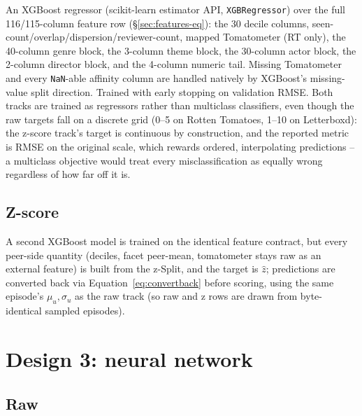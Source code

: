 \documentclass[11pt]{article}
\begin{document}
An XGBoost regressor (scikit-learn estimator API, \texttt{XGBRegressor}) over the full 116/115-column feature row (\S\ref{sec:features-eq}): the 30 decile columns, seen-count/overlap/dispersion/reviewer-count, mapped Tomatometer (RT only), the 40-column genre block, the 3-column theme block, the 30-column actor block, the 2-column director block, and the 4-column numeric tail. Missing Tomatometer and every \texttt{NaN}-able affinity column are handled natively by XGBoost's missing-value split direction. Trained with early stopping on validation RMSE. Both tracks are trained as regressors rather than multiclass classifiers, even though the raw targets fall on a discrete grid (0--5 on Rotten Tomatoes, 1--10 on Letterboxd): the z-score track's target is continuous by construction, and the reported metric is RMSE on the original scale, which rewards ordered, interpolating predictions -- a multiclass objective would treat every misclassification as equally wrong regardless of how far off it is.

\subsection{Z-score}

A second XGBoost model is trained on the identical feature contract, but every peer-side quantity (deciles, facet peer-mean, tomatometer stays raw as an external feature) is built from the z-Split, and the target is $\hat z$; predictions are converted back via Equation~\ref{eq:convertback} before scoring, using the same episode's $\mu_u,\sigma_u$ as the raw track (so raw and z rows are drawn from byte-identical sampled episodes).

\section{Design 3: neural network}
\label{sec:design3}

\subsection{Raw}
\end{document}
